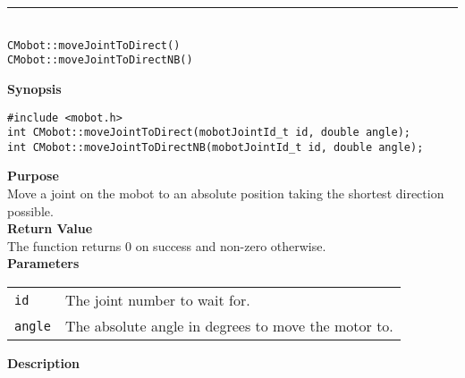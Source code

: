 \noindent
\vspace{5pt}
\rule{4.5in}{0.015in}\\
\noindent
{\LARGE \texttt{CMobot::moveJointToDirect()}}\\
{\LARGE \texttt{CMobot::moveJointToDirectNB()}}\\
{}

\noindent
{\bf Synopsis}
\vspace{-8pt}
\begin{verbatim}
#include <mobot.h>
int CMobot::moveJointToDirect(mobotJointId_t id, double angle);
int CMobot::moveJointToDirectNB(mobotJointId_t id, double angle);
\end{verbatim}

\noindent
{\bf Purpose}\\
Move a joint on the mobot to an absolute position taking the shortest direction possible.\\

\noindent
{\bf Return Value}\\
The function returns 0 on success and non-zero otherwise.\\

\noindent
{\bf Parameters}\\
\vspace{-0.1in}
\begin{description}
\item               
\begin{tabular}{p{10 mm}p{145 mm}}
\texttt{id} & The joint number to wait for. \\
\texttt{angle} & The absolute angle in degrees to move the motor to.  \\
\end{tabular}
\end{description}

\noindent
{\bf Description}\\
\vspace{-12pt}

